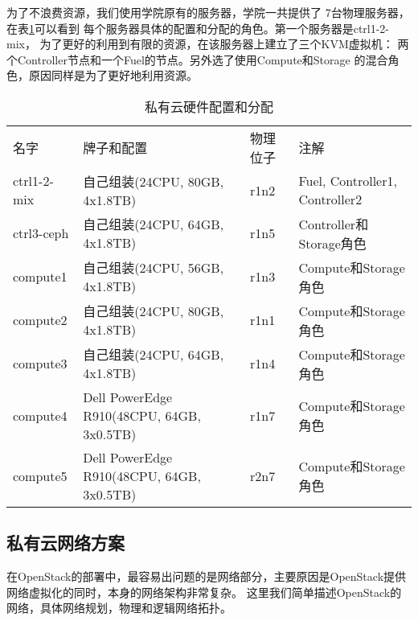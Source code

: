 为了不浪费资源，我们使用学院原有的服务器，学院一共提供了
7台物理服务器，在表\ref{tab:hardware-table}可以看到
每个服务器具体的配置和分配的角色。第一个服务器是ctrl1-2-mix，
为了更好的利用到有限的资源，在该服务器上建立了三个KVM虚拟机：
两个Controller节点和一个Fuel的节点。另外选了使用Compute和Storage
的混合角色，原因同样是为了更好地利用资源。
\begin{table}[H]
  \centering
  \begin{minipage}[t]{0.98\linewidth} %
  \caption[私有云硬件配置和分配]{私有云硬件配置和分配}
  \label{tab:hardware-table}
    \begin{tabularx}{\linewidth}{lXlX}
      \toprule[1.5pt]
        名字 & 牌子和配置 &  物理位子 & 注解\\
        ctrl1-2-mix & 自己组装\newline(24CPU, 80GB, 4x1.8TB) & r1n2 & Fuel, Controller1, Controller2  \\
        ctrl3-ceph & 自己组装\newline(24CPU, 64GB, 4x1.8TB) & r1n5 & Controller和Storage角色  \\
        compute1 & 自己组装\newline(24CPU, 56GB, 4x1.8TB) & r1n3 & Compute和Storage角色  \\
        compute2 & 自己组装\newline(24CPU, 80GB, 4x1.8TB) & r1n1 & Compute和Storage角色  \\
        compute3 & 自己组装\newline(24CPU, 64GB, 4x1.8TB) & r1n4 & Compute和Storage角色  \\
        compute4 & Dell PowerEdge R910\newline(48CPU, 64GB, 3x0.5TB) & r1n7 & Compute和Storage角色  \\
        compute5 & Dell PowerEdge R910\newline(48CPU, 64GB, 3x0.5TB) & r2n7 & Compute和Storage角色  \\
      \bottomrule[1.5pt]
    \end{tabularx}
  \end{minipage}
\end{table}


\subsection{私有云网络方案}
在OpenStack的部署中，最容易出问题的是网络部分，主要原因是OpenStack提供网络虚拟化的同时，本身的网络架构非常复杂。
这里我们简单描述OpenStack的网络，具体网络规划，物理和逻辑网络拓扑。

